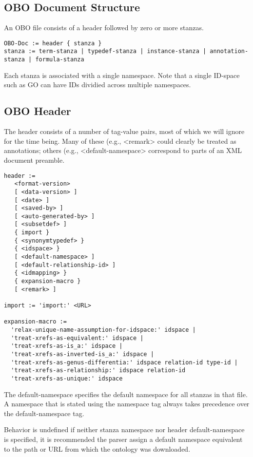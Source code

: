 \subsection{OBO Document Structure}

An OBO file consists of a header followed by zero or more stanzas.

\begin{verbatim}
OBO-Doc := header { stanza }
stanza := term-stanza | typedef-stanza | instance-stanza | annotation-stanza | formula-stanza
\end{verbatim}

Each stanza is associated with a single namespace. Note that a single
ID-space such as GO can have IDs dividied across multiple namespaces.

\subsection{OBO Header}

The header consists of a number of tag-value pairs, most of which we will ignore for the time being. Many of these (e.g., <remark> could clearly be treated as annotations; others (e.g., <default-namespace> correspond to parts of an XML document preamble.

\begin{verbatim}
header :=
   <format-version>
   [ <data-version> ]
   [ <date> ]
   [ <saved-by> ]
   [ <auto-generated-by> ]
   [ <subsetdef> ]
   { import }
   { <synonymtypedef> }
   { <idspace> }
   [ <default-namespace> ]
   [ <default-relationship-id> ]
   { <idmapping> }
   { expansion-macro }
   [ <remark> ]

import := 'import:' <URL>

expansion-macro :=
  'relax-unique-name-assumption-for-idspace:' idspace |
  'treat-xrefs-as-equivalent:' idspace |
  'treat-xrefs-as-is_a:' idspace |
  'treat-xrefs-as-inverted-is_a:' idspace |
  'treat-xrefs-as-genus-differentia:' idspace relation-id type-id |
  'treat-xrefs-as-relationship:' idspace relation-id
  'treat-xrefs-as-unique:' idspace

\end{verbatim}

The default-namespace specifies the default namespace for all stanzas
in that file. A namespace that is stated using the namespace tag
always takes precedence over the default-namespace tag.

Behavior is undefined if neither stanza namespace nor header
default-namespace is specified, it is recommended the parser assign a
default namespace equivalent to the path or URL from which the
ontology was downloaded.


